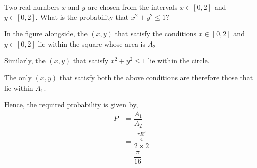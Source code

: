 \question[5] Two real numbers $x$ and $y$ are chosen from the intervals
$x\in [0,2]$ and $y\in [0,2]$. What is the probability that $x^2+y^2\leq 1$?

\ifprintanswers
  \begin{marginfigure}
  \end{marginfigure} 
\fi 

\begin{solution}[\halfpage]
  In the figure alongside, the $(x,y)$ that satisfy the conditions
  $x\in [0,2]$ and $y\in [0,2]$ lie within the square whose area is $A_2$

  Similarly, the $(x,y)$ that satisfy $x^2+y^2\leq 1$ lie within the circle.

  The only $(x,y)$ that satisfy both the above conditions are therefore
  those that lie within $A_1$.

  Hence, the required probability is given by, 
  \begin{align}
     P &= \dfrac{A_1}{A_2} \\
     &= \dfrac{\frac{\pi R^2}{4}}{2\times 2} \\ 
     &= \dfrac{\pi}{16} 
  \end{align} 
\end{solution}
